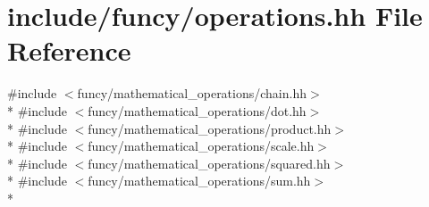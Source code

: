 \hypertarget{operations_8hh}{\section{include/funcy/operations.hh File Reference}
\label{operations_8hh}
}
{\ttfamily \#include $<$funcy/mathematical\-\_\-operations/chain.\-hh$>$}\\*
{\ttfamily \#include $<$funcy/mathematical\-\_\-operations/dot.\-hh$>$}\\*
{\ttfamily \#include $<$funcy/mathematical\-\_\-operations/product.\-hh$>$}\\*
{\ttfamily \#include $<$funcy/mathematical\-\_\-operations/scale.\-hh$>$}\\*
{\ttfamily \#include $<$funcy/mathematical\-\_\-operations/squared.\-hh$>$}\\*
{\ttfamily \#include $<$funcy/mathematical\-\_\-operations/sum.\-hh$>$}\\*

